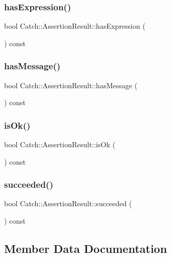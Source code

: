 \subsubsection{has\+Expression()}
{\footnotesize\ttfamily bool Catch\+::\+Assertion\+Result\+::has\+Expression (\begin{DoxyParamCaption}{ }\end{DoxyParamCaption}) const}

\mbox{\label{class_catch_1_1_assertion_result_aae37064b401919fa8ac480ef86cca924}} 
\subsubsection{has\+Message()}
{\footnotesize\ttfamily bool Catch\+::\+Assertion\+Result\+::has\+Message (\begin{DoxyParamCaption}{ }\end{DoxyParamCaption}) const}

\mbox{\label{class_catch_1_1_assertion_result_ae39658b71c4afc3c8a859043b0e97027}} 
\subsubsection{is\+Ok()}
{\footnotesize\ttfamily bool Catch\+::\+Assertion\+Result\+::is\+Ok (\begin{DoxyParamCaption}{ }\end{DoxyParamCaption}) const}

\mbox{\label{class_catch_1_1_assertion_result_ac5cc872b721d5fb65d87221d30b22fdd}} 
\subsubsection{succeeded()}
{\footnotesize\ttfamily bool Catch\+::\+Assertion\+Result\+::succeeded (\begin{DoxyParamCaption}{ }\end{DoxyParamCaption}) const}



\subsection{Member Data Documentation}
\mbox{\label{class_catch_1_1_assertion_result_a3e7236f73a51d6fc8bb9dfdefcee7772}} 
